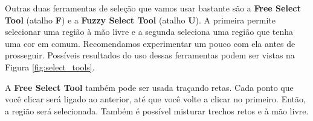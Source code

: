 \documentclass[12pt,onecolumn]{article}
\begin{document}
    Outras duas ferramentas de seleção que vamos usar bastante são a {\bf
    Free Select Tool} (atalho {\bf F}) e a {\bf Fuzzy Select Tool} (atalho
    {\bf U}). A primeira permite selecionar uma região à mão livre e a segunda
    seleciona uma região que tenha uma cor em comum. Recomendamos experimentar
    um pouco com ela antes de prosseguir. Possíveis resultados do uso dessas
    ferramentas podem ser vistas na Figura \ref{fig:select_tools}.
    
    \begin{framed}
      A {\bf Free Select Tool} também pode ser usada traçando retas. Cada ponto
      que você clicar será ligado ao anterior, até que você volte a clicar no
      primeiro. Então, a região será selecionada. Também é possível misturar
      trechos retos e à mão livre.
    \end{framed}
    
\end{document}

